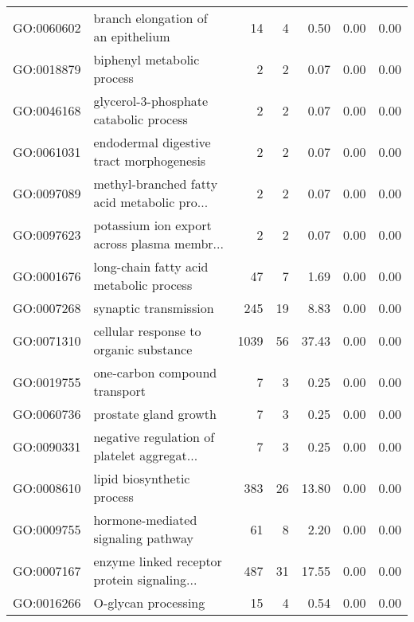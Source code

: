 \begin{table}[ht]
\begin{tabular}{llrrrrr}
  GO:0060602 & branch elongation of an epithelium &  14 &   4 & 0.50 & 0.00 & 0.00 \\ 
  GO:0018879 & biphenyl metabolic process &   2 &   2 & 0.07 & 0.00 & 0.00 \\ 
  GO:0046168 & glycerol-3-phosphate catabolic process &   2 &   2 & 0.07 & 0.00 & 0.00 \\ 
  GO:0061031 & endodermal digestive tract morphogenesis &   2 &   2 & 0.07 & 0.00 & 0.00 \\ 
  GO:0097089 & methyl-branched fatty acid metabolic pro... &   2 &   2 & 0.07 & 0.00 & 0.00 \\ 
  GO:0097623 & potassium ion export across plasma membr... &   2 &   2 & 0.07 & 0.00 & 0.00 \\ 
  GO:0001676 & long-chain fatty acid metabolic process &  47 &   7 & 1.69 & 0.00 & 0.00 \\ 
  GO:0007268 & synaptic transmission & 245 &  19 & 8.83 & 0.00 & 0.00 \\ 
  GO:0071310 & cellular response to organic substance & 1039 &  56 & 37.43 & 0.00 & 0.00 \\ 
  GO:0019755 & one-carbon compound transport &   7 &   3 & 0.25 & 0.00 & 0.00 \\ 
  GO:0060736 & prostate gland growth &   7 &   3 & 0.25 & 0.00 & 0.00 \\ 
  GO:0090331 & negative regulation of platelet aggregat... &   7 &   3 & 0.25 & 0.00 & 0.00 \\ 
  GO:0008610 & lipid biosynthetic process & 383 &  26 & 13.80 & 0.00 & 0.00 \\ 
  GO:0009755 & hormone-mediated signaling pathway &  61 &   8 & 2.20 & 0.00 & 0.00 \\ 
  GO:0007167 & enzyme linked receptor protein signaling... & 487 &  31 & 17.55 & 0.00 & 0.00 \\ 
  GO:0016266 & O-glycan processing &  15 &   4 & 0.54 & 0.00 & 0.00 \\ 
   \hline
\end{tabular}
\end{table}
